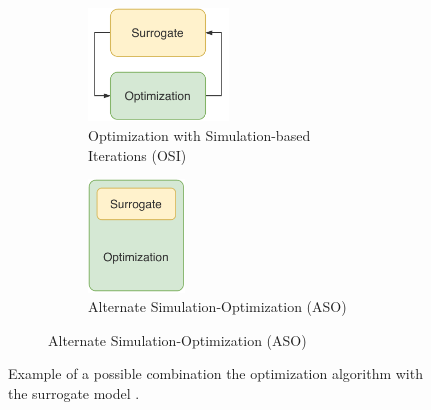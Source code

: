         \begin{figure}
            \centering
            \begin{subfigure}{\textwidth}
                \centering
                \begin{subfigure}{0.45\textwidth}
                    \centering
                    \includegraphics[height=3cm]{content/images/utility/architecture_aso}
                    \caption{Optimization with Simulation-based Iterations (OSI)}
                    \label{fig:surr_opt_architecture_aso}
                \end{subfigure} 
                \begin{subfigure}{0.45\textwidth}
                    \centering
                    \includegraphics[height=3cm]{content/images/utility/architecture_iso}
                    \caption{Alternate Simulation-Optimization (ASO)}
                    \label{fig:surr_opt_architecture_iso}
                \end{subfigure} 
            \end{subfigure} 

            \caption[Example of a possible combination the optimization algorithm with the surrogate model.]{Example of a possible combination the optimization algorithm with the surrogate model \cite{FigueiraA14}. }
            \label{fig:surr_opt_architecture}    
        \end{figure}


